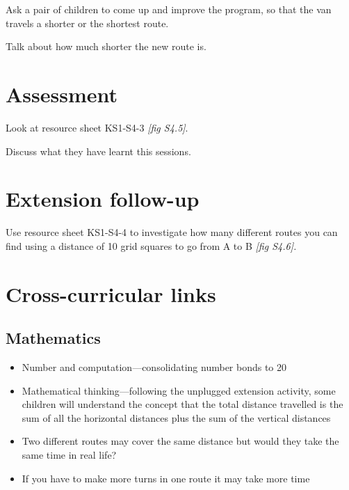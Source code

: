 \documentclass{../../../lessonplan}
\begin{document}
\begin{lessonplan}

Ask a pair of children to come up and improve the program, so that the van travels a shorter or the shortest route.


Talk about how much shorter the new route is.

\section*{Assessment}

Look at resource sheet KS1-S4-3 \textit{[fig S4.5]}.



Discuss what they have learnt this sessions.

\section*{Extension follow-up}

Use resource sheet KS1-S4-4 to investigate how many different routes you can find using a distance of 10 grid squares to go from A to B \textit{[fig S4.6].}


\section*{Cross-curricular links}

\subsection*{Mathematics}

\begin{itemize}
\item Number and computation---consolidating number bonds to 20
\item Mathematical thinking---following the unplugged extension activity, some children will understand the concept that the total distance travelled is the sum of all the horizontal distances plus the sum of the vertical distances
\item Two different routes may cover the same distance but would they take the same time in real life?
\item If you have to make more turns in one route it may take more time
\end{itemize}


\end{lessonplan}
\end{document}
